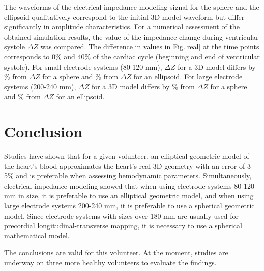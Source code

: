 \documentclass[conference]{IEEEtran}
\begin{document}
The waveforms of the electrical impedance modeling signal for the sphere and the
ellipsoid qualitatively correspond to the initial 3D model waveform but differ
significantly in amplitude characteristics. For a numerical assessment of the
obtained simulation results, the value of the impedance change during
ventricular systole $ \Delta Z $ was compared. The difference in values ​​in
Fig.\ref{real} at the time points corresponds to 0\% and 40\% of the cardiac
cycle (beginning and end of ventricular systole). For small electrode systems
(80-120 mm), $\Delta Z$ for a 3D model differs by \% from $\Delta Z $ for a
sphere and \% from $\Delta Z$ for an ellipsoid. For large electrode systems
(200-240 mm), $\Delta Z$ for a 3D model differs by \% from $\Delta Z$ for a
sphere and \% from $\Delta Z $ for an ellipsoid.%

\section{Conclusion}

Studies have shown that for a given volunteer, an elliptical geometric model of
the heart's blood approximates the heart's real 3D geometry with an error of
3-5\% and is preferable when assessing hemodynamic parameters. Simultaneously,
electrical impedance modeling showed that when using electrode systems 80-120 mm
in size, it is preferable to use an elliptical geometric model, and when using
large electrode systems 200-240 mm, it is preferable to use a spherical
geometric model. Since electrode systems with sizes over 180 mm are usually used
for precordial longitudinal-transverse mapping, it is necessary to use a
spherical mathematical model.

The conclusions are valid for this volunteer. At the moment, studies are
underway on three more healthy volunteers to evaluate the findings. 
\end{document}
